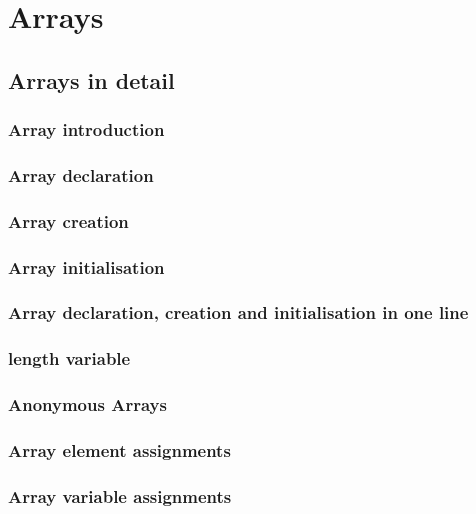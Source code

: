 \documentclass[14pt,fleqn]{extbook} %
\begin{document}
\chapter{Arrays}
\section{Arrays in detail}
%
\subsection{Array introduction}

\subsection{Array declaration}

\subsection{Array creation}

%
\subsection{Array initialisation}

\subsection{Array declaration, creation and initialisation in one line}

\subsection{length variable}

\subsection{Anonymous Arrays}

\subsection{Array element assignments}

\subsection{Array variable assignments}

\end{document}
